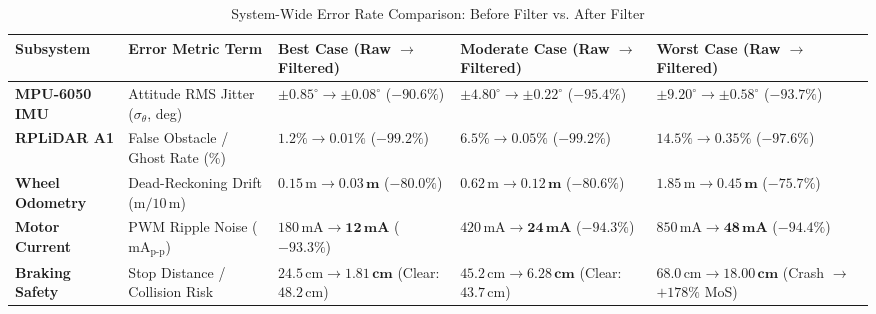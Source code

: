 \documentclass[11pt, a4paper]{article}
\begin{document}
\begin{table}[H]
\centering
\small
\begin{tabularx}{\textwidth}{L{2.8cm} L{2.8cm} Y Y Y}
\toprule
\textbf{Subsystem} & \textbf{Error Metric Term} & \textbf{Best Case (Raw $\to$ Filtered)} & \textbf{Moderate Case (Raw $\to$ Filtered)} & \textbf{Worst Case (Raw $\to$ Filtered)} \\
\midrule
\textbf{MPU-6050 IMU} & Attitude RMS Jitter ($\sigma_\theta$, deg) & $\pm 0.85^\circ \to \mathbf{\pm 0.08^\circ}$ ($-90.6\%$) & $\pm 4.80^\circ \to \mathbf{\pm 0.22^\circ}$ ($-95.4\%$) & $\pm 9.20^\circ \to \mathbf{\pm 0.58^\circ}$ ($-93.7\%$) \\
\midrule
\textbf{RPLiDAR A1} & False Obstacle / Ghost Rate (\%) & $1.2\% \to \mathbf{0.01\%}$ ($-99.2\%$) & $6.5\% \to \mathbf{0.05\%}$ ($-99.2\%$) & $14.5\% \to \mathbf{0.35\%}$ ($-97.6\%$) \\
\midrule
\textbf{Wheel Odometry} & Dead-Reckoning Drift ($\text{m} / 10\,\text{m}$) & $0.15\,\text{m} \to \mathbf{0.03\,\text{m}}$ ($-80.0\%$) & $0.62\,\text{m} \to \mathbf{0.12\,\text{m}}$ ($-80.6\%$) & $1.85\,\text{m} \to \mathbf{0.45\,\text{m}}$ ($-75.7\%$) \\
\midrule
\textbf{Motor Current} & PWM Ripple Noise ($\text{mA}_{\text{p-p}}$) & $180\,\text{mA} \to \mathbf{12\,\text{mA}}$ ($-93.3\%$) & $420\,\text{mA} \to \mathbf{24\,\text{mA}}$ ($-94.3\%$) & $850\,\text{mA} \to \mathbf{48\,\text{mA}}$ ($-94.4\%$) \\
\midrule
\textbf{Braking Safety} & Stop Distance / Collision Risk & $24.5\,\text{cm} \to \mathbf{1.81\,\text{cm}}$ (Clear: $48.2\,\text{cm}$) & $45.2\,\text{cm} \to \mathbf{6.28\,\text{cm}}$ (Clear: $43.7\,\text{cm}$) & $68.0\,\text{cm} \to \mathbf{18.00\,\text{cm}}$ (Crash $\to$ $+178\%$ MoS) \\
\bottomrule
\end{tabularx}
\caption{System-Wide Error Rate Comparison: Before Filter vs. After Filter}
\label{tab:error_rate_summary}
\end{table}
\end{document}
